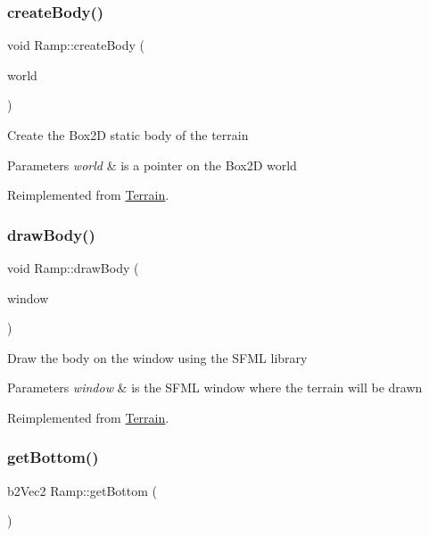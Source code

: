 \subsubsection{\texorpdfstring{create\+Body()}{createBody()}}
{\footnotesize\ttfamily void Ramp\+::create\+Body (\begin{DoxyParamCaption}\item[{b2\+World $\ast$}]{world }\end{DoxyParamCaption})\hspace{0.3cm}{\ttfamily [virtual]}}

Create the Box2D static body of the terrain 
\begin{DoxyParams}{Parameters}
{\em world} & is a pointer on the Box2D world \\
\hline
\end{DoxyParams}


Reimplemented from \mbox{\hyperlink{class_terrain_a97e007277f8abb9dde20ef2b49c38a3a}{Terrain}}.

\mbox{\label{class_ramp_ab05c0a8c5706488be4aba9c4f52f55c9}} 
\subsubsection{\texorpdfstring{draw\+Body()}{drawBody()}}
{\footnotesize\ttfamily void Ramp\+::draw\+Body (\begin{DoxyParamCaption}\item[{sf\+::\+Render\+Window \&}]{window }\end{DoxyParamCaption})\hspace{0.3cm}{\ttfamily [virtual]}}

Draw the body on the window using the S\+F\+ML library 
\begin{DoxyParams}{Parameters}
{\em window} & is the S\+F\+ML window where the terrain will be drawn \\
\hline
\end{DoxyParams}


Reimplemented from \mbox{\hyperlink{class_terrain_ae60571b91c1979fa94bdfc5002da6ac7}{Terrain}}.

\mbox{\label{class_ramp_a6e4926a2d16651162340113155e91e8f}} 
\subsubsection{\texorpdfstring{get\+Bottom()}{getBottom()}}
{\footnotesize\ttfamily b2\+Vec2 Ramp\+::get\+Bottom (\begin{DoxyParamCaption}{ }\end{DoxyParamCaption})\hspace{0.3cm}{\ttfamily [virtual]}}

